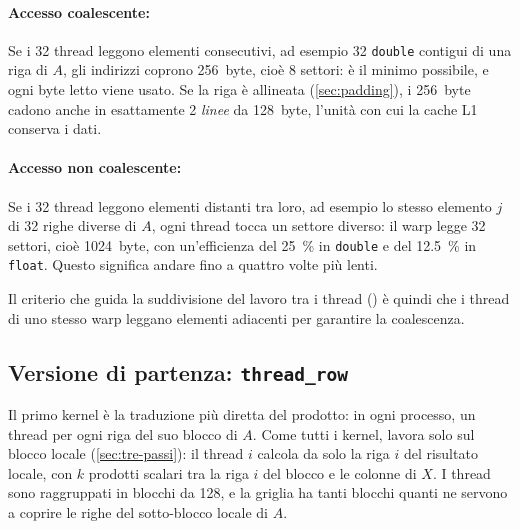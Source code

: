 \documentclass[11pt,a4paper]{article}
\begin{document}
\paragraph{Accesso coalescente:} Se i 32 thread leggono elementi consecutivi,
ad esempio 32 \texttt{double} contigui di una riga di $A$, gli indirizzi coprono
\SI{256}{byte}, cioè 8 settori: è il minimo possibile, e ogni byte letto viene
usato. Se la riga è allineata (\cref{sec:padding}), i \SI{256}{byte} cadono
anche in esattamente 2 \emph{linee} da \SI{128}{byte}, l'unità con cui la cache
L1 conserva i dati.

\paragraph{Accesso non coalescente:} Se i 32 thread leggono elementi distanti
tra loro, ad esempio lo stesso elemento $j$ di 32 righe diverse di $A$, ogni
thread tocca un settore diverso: il warp legge 32 settori, cioè
\SI{1024}{byte},  con un'efficienza del \SI{25}{\percent} in
\texttt{double} e del \SI{12.5}{\percent} in \texttt{float}. Questo significa andare fino a quattro volte più lenti.

Il criterio che guida la suddivisione del lavoro tra i thread
() è quindi che i thread di uno
stesso warp leggano elementi adiacenti per garantire la coalescenza.

\subsection{Versione di partenza: \texttt{thread\_row}}\label{sec:thread-row}

Il primo kernel è la traduzione più diretta del prodotto: in ogni processo, un
thread per ogni riga del suo blocco di $A$. Come tutti i kernel, lavora solo
sul blocco locale (\cref{sec:tre-passi}): il thread $i$ calcola da solo la
riga $i$ del risultato locale, con $k$ prodotti scalari tra la riga $i$ del
blocco e le colonne di $X$. I thread sono raggruppati in blocchi da 128, e la
griglia ha tanti blocchi quanti ne servono a coprire le righe del sotto-blocco locale di $A$.
\end{document}

